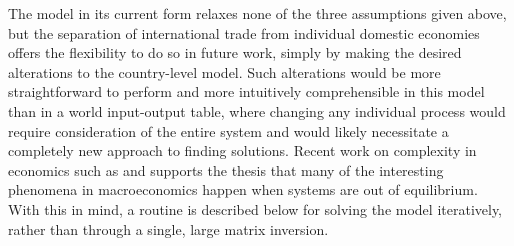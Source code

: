 \documentclass[a4paper]{article}
\begin{document}
The model in its current form relaxes none of the three assumptions given above, but the separation of international trade from individual domestic economies offers the flexibility to do so in future work, simply by making the desired alterations to the country-level model.
Such alterations would be more straightforward to perform and more intuitively comprehensible in this model than in a world input-output table, where changing any individual process would require consideration of the entire system and would likely necessitate a completely new approach to finding solutions.
Recent work on complexity in economics such as \textcite{beinhocker_origin_2006} and \textcite{ramalingam_exploring_2009} supports the thesis that many of the interesting phenomena in macroeconomics happen when systems are out of equilibrium.
With this in mind, a routine is described below for solving the model iteratively, rather than through a single, large matrix inversion.
\end{document}

